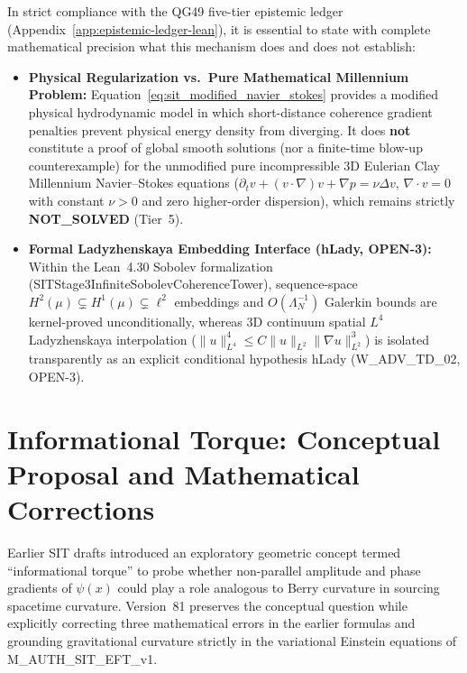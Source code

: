 \documentclass[american,11pt,letterpaper]{article}
\def\mathbf#1{#1}%
\def\texttt#1{#1}%
\def\emph#1{#1}%
\begin{document}
In strict compliance with the \texttt{QG49} five-tier epistemic ledger (Appendix~\ref{app:epistemic-ledger-lean}), it is essential to state with complete mathematical precision what this mechanism does and does \emph{not} establish:
\begin{itemize}
  \item \textbf{Physical Regularization vs.\ Pure Mathematical Millennium Problem:} Equation~\eqref{eq:sit_modified_navier_stokes} provides a \emph{modified physical hydrodynamic model} in which short-distance coherence gradient penalties prevent physical energy density from diverging. It does \textbf{not} constitute a proof of global smooth solutions (nor a finite-time blow-up counterexample) for the \emph{unmodified} pure incompressible 3D Eulerian Clay Millennium Navier--Stokes equations ($\partial_t\mathbf{v} + (\mathbf{v}\cdot\nabla)\mathbf{v} + \nabla p = \nu\Delta\mathbf{v}$, $\nabla\cdot\mathbf{v} = 0$ with constant $\nu > 0$ and zero higher-order dispersion), which remains strictly \textbf{\texttt{NOT\_SOLVED}} (Tier~5).
  \item \textbf{Formal Ladyzhenskaya Embedding Interface (\texttt{hLady}, \texttt{OPEN-3}):} Within the Lean~4.30 Sobolev formalization (\texttt{SITStage3\allowbreak{}Infinite\allowbreak{}Sobolev\allowbreak{}Coherence\allowbreak{}Tower}), sequence-space $H^2(\mu) \subsetneq H^1(\mu) \subsetneq \ell^2$ embeddings and $O(\Lambda_N^{-1})$ Galerkin bounds are kernel-proved unconditionally, whereas 3D continuum spatial $L^4$ Ladyzhenskaya interpolation ($\|u\|_{L^4}^4 \le C\|u\|_{L^2}\|\nabla u\|_{L^2}^3$) is isolated transparently as an explicit conditional hypothesis \texttt{hLady} (\texttt{W\_ADV\_TD\_02}, \texttt{OPEN-3}).
\end{itemize}

\section{Informational Torque: Conceptual Proposal and Mathematical Corrections}
\label{sec:informational-torque}
\label{sec:informational_torque}

Earlier SIT drafts introduced an exploratory geometric concept termed ``informational torque'' to probe whether non-parallel amplitude and phase gradients of $\psi(x)$ could play a role analogous to Berry curvature in sourcing spacetime curvature. Version~81 preserves the conceptual question while explicitly correcting three mathematical errors in the earlier formulas and grounding gravitational curvature strictly in the variational Einstein equations of \texttt{M\_AUTH\_SIT\_EFT\_v1}.
\end{document}
